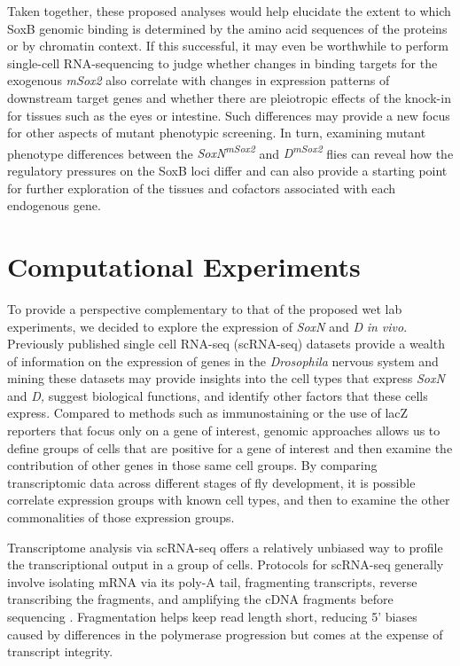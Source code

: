 \documentclass[withindex,glossary]{cam-thesis}
\begin{document}
Taken together, these proposed analyses would help elucidate the extent
to which SoxB genomic binding is determined by the amino acid sequences
of the proteins or by chromatin context. If this successful, it may even
be worthwhile to perform single-cell RNA-sequencing to judge whether
changes in binding targets for the exogenous \emph{mSox2} also correlate
with changes in expression patterns of downstream target genes and
whether there are pleiotropic effects of the knock-in for tissues such
as the eyes or intestine. Such differences may provide a new focus for
other aspects of mutant phenotypic screening. In turn, examining mutant
phenotype differences between the \emph{SoxN\textsuperscript{mSox2}} and
\emph{D\textsuperscript{mSox2}} flies can reveal how the regulatory
pressures on the SoxB loci differ and can also provide a starting point
for further exploration of the tissues and cofactors associated with
each endogenous gene.

\chapter{Computational Experiments}

To provide a perspective complementary to that of the proposed wet lab
experiments, we decided to explore the expression of \emph{SoxN} and
\emph{D} \emph{in vivo}. Previously published single cell RNA-seq
(\gls{scRNA-seq}) datasets  provide a wealth of information on the
expression of genes in the \emph{Drosophila} nervous system and mining
these datasets may provide insights into the cell types that express
\emph{SoxN} and \emph{D,} suggest biological functions, and identify
other factors that these cells express. Compared to methods such as
immunostaining or the use of lacZ reporters that focus only on a gene of
interest, genomic approaches allows us to define groups of cells that
are positive for a gene of interest and then examine the contribution of
other genes in those same cell groups. By comparing transcriptomic data
across different stages of fly development, it is possible correlate
expression groups with known cell types, and then to examine the other
commonalities of those expression groups.

Transcriptome analysis via scRNA-seq offers a relatively unbiased way to
profile the transcriptional output in a group of cells. Protocols for
scRNA-seq generally involve isolating mRNA via its poly-A tail,
fragmenting transcripts, reverse transcribing the fragments, and
amplifying the cDNA fragments before sequencing .
Fragmentation helps keep read length short, reducing 5' biases caused by
differences in the polymerase progression  but
comes at the expense of transcript integrity.
\end{document}
